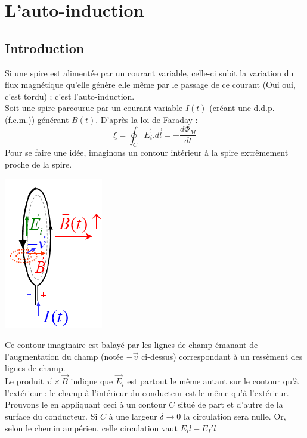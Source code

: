 \documentclass	[11pt, a4paper, openany]{book}
\begin{document}
\section{L'auto-induction}
\subsection{Introduction}
Si  une spire est alimentée par un courant variable, celle-ci subit la variation du flux magnétique qu'elle génère elle même par le passage de ce courant (Oui oui, c'est tordu) ; c'est l'auto-induction.\\

Soit une spire parcourue par un courant variable $I(t)$ (créant une d.d.p. (f.e.m.)) générant $B(t)$. D'après la loi de Faraday : 
\begin{equation}
	\xi = \oint_C \vec{E}_i.\vec{dl} = -\frac{d\Phi_M}{dt}
\end{equation}
Pour se faire une idée, imaginons un contour intérieur à la spire extrêmement proche de la spire.

\begin{center}
	\includegraphics[scale=0.55]{em/image20.png}\\
\end{center}

Ce contour imaginaire est balayé par les lignes de champ émanant de l'augmentation du champ (notée $-\vec{v}$ ci-dessus) correspondant à un ressèment des lignes de champ.\\
Le produit $\vec{v} \times \vec{B}$ indique que $\vec{E}_i$ est partout le même autant sur le contour qu'à l'extérieur : le champ à l'intérieur du conducteur est le même qu'à l'extérieur.\\
Prouvons le en appliquant ceci à un contour $C$ situé de part et d'autre de la surface du conducteur. Si $C$ à une largeur $\delta \rightarrow 0$ la circulation sera nulle. Or, selon le chemin ampérien, celle circulation vaut $E_il - E_I'l$
\end{document}
